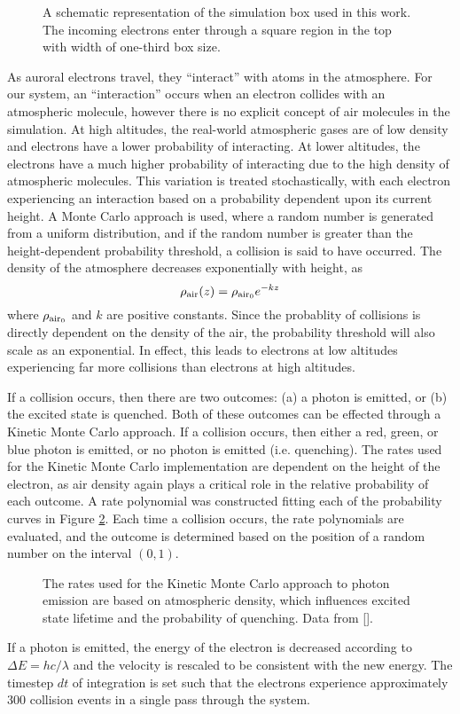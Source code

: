 \documentclass[twocolumn]{article}
\renewcommand{\insertfigure}[3]{\begin{figure}[tbh]
\centering
	\makebox[\columnwidth][c]{
	\texttt{[image: \#1]}
	}
\caption{#3}
\label{#1}
\end{figure}}
\begin{document}
\insertfigure{../presentation/img/simulation_cell_w_earth.pdf}{0.9}{A schematic representation of the simulation box used in this work.  The incoming electrons enter through a square region in the top with width of one-third box size. }

As auroral electrons travel, they ``interact'' with atoms in the atmosphere. 
For our system, an ``interaction'' occurs when an electron collides with an atmospheric molecule, however there is no explicit concept of air molecules in the simulation.  
At high altitudes, the real-world atmospheric gases are of low density and electrons have a lower probability of interacting.  
At lower altitudes, the electrons have a much higher probability of interacting due to the high density of atmospheric molecules.  
This variation is treated stochastically, with each electron experiencing an interaction based on a probability dependent upon its current height.  A Monte Carlo approach is used, where a random number is generated from a uniform distribution, and if the random number is greater than the height-dependent probability threshold, a collision is said to have occurred.  The density of the atmosphere decreases exponentially with height, as \cite{Administration1976}
\begin{equation}
\rho_{\mathrm{air}} (z) = \rho_{\mathrm{air_0}}e^{-kz}
\end{equation}
where $\rho_{\mathrm{air_0}}$ and $k$ are positive constants.  Since the probablity of collisions is directly dependent on the density of the air, the probability threshold will also scale as an exponential.  In effect, this leads to electrons at low altitudes experiencing far more collisions than electrons at high altitudes. 
 
If a collision occurs, then there are two outcomes: (a) a photon is emitted, or (b) the excited state is quenched.  Both of these outcomes can be effected through a Kinetic Monte Carlo approach.  
If a collision occurs, then either a red, green, or blue photon is emitted, or no photon is emitted (i.e. quenching).  
The rates used for the Kinetic Monte Carlo implementation are dependent on the height of the electron, as air density again plays a critical role in the relative probability of each outcome.
A rate polynomial was constructed fitting each of the probability curves in Figure \ref{../presentation/img/Earth_color_probs_paper.pdf}.  Each time a collision occurs, the rate polynomials are evaluated, and the outcome is determined based on the position of a random number on the interval $(0,1)$. \insertfigure{../presentation/img/Earth_color_probs_paper.pdf}{1.0}{The rates used for the Kinetic Monte Carlo approach to photon emission are based on atmospheric density, which influences excited state lifetime and the probability of quenching. Data from [\citen{Baranoski2003}].}
If a photon is emitted, the energy of the electron is decreased according to $\Delta E = hc/\lambda$ and the velocity is rescaled to be consistent with the new energy.
The timestep $dt$ of integration is set such that the electrons experience approximately 300 collision events in a single pass through the system\cite{Baranoski2005}.
\end{document}
